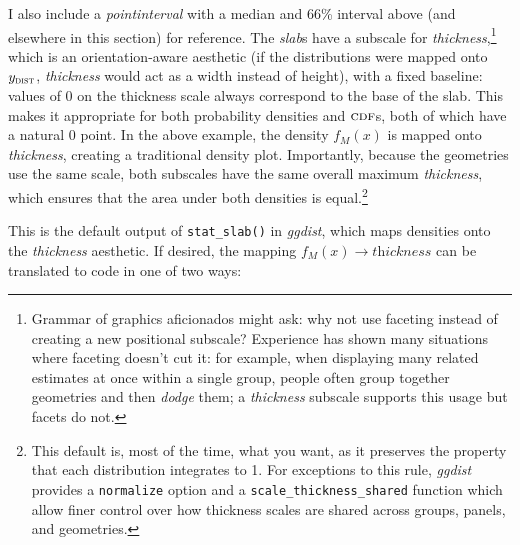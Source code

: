 \documentclass[journal]{vgtc}                     %
\begin{document}
I also include a \textit{pointinterval} with a median and 66\% interval above (and elsewhere in this section) for reference. The \textit{slab}s have a subscale for \textit{thickness},\footnote{Grammar of graphics aficionados might ask: why not use faceting instead of creating a new positional subscale? Experience has shown many situations where faceting doesn't cut it: for example, when displaying many related estimates at once within a single group, people often group together geometries and then \textit{dodge} them; a \textit{thickness} subscale supports this usage but facets do not.} which is an orientation-aware aesthetic (if the distributions were mapped onto $y_\textsc{dist}$, \textit{thickness} would act as a width instead of height), with a fixed baseline: values of 0 on the thickness scale always correspond to the base of the slab. This makes it appropriate for both probability densities and $\textsc{cdf}$s, both of which have a natural 0 point. In the above example, the density $f_M(x)$ is mapped onto \textit{thickness}, creating a traditional density plot. Importantly, because the geometries use the same scale, both subscales have the same overall maximum \textit{thickness}, which ensures that the area under both densities is equal.\footnote{This default is, most of the time, what you want, as it preserves the property that each distribution integrates to 1. For exceptions to this rule, \textit{ggdist} provides a \texttt{normalize} option and a \texttt{scale\_thickness\_shared} function which allow finer control over how thickness scales are shared across groups, panels, and geometries.} 

This is the default output of \texttt{stat\_slab()} in \textit{ggdist}, which maps densities onto the \textit{thickness} aesthetic. If desired, the mapping $f_M(x) \rightarrow \textit{thickness}$ can be translated to code in one of two ways:
\end{document}

